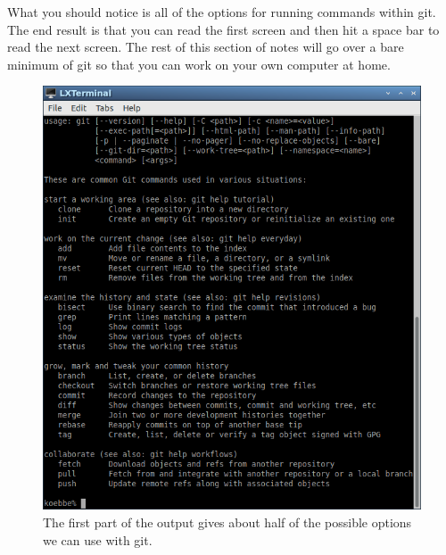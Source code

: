 \documentclass[10pt,fleqn]{article}
\begin{document}
What you should notice is all of the options for running commands within git.
The end result is that you can read the first screen and then hit a space bar
to read the next screen. The rest of this section of notes will go over a bare
minimum of git so that you can work on your own computer at home.
\vfill
\begin{figure}[h]
\centering
\includegraphics[width=5.0in]{../images/git_02.png}
\vskip0.1in
\caption{The first part of the output gives about half of the possible options
         we can use with git.}
\end{figure}
\vfill
\end{document}
